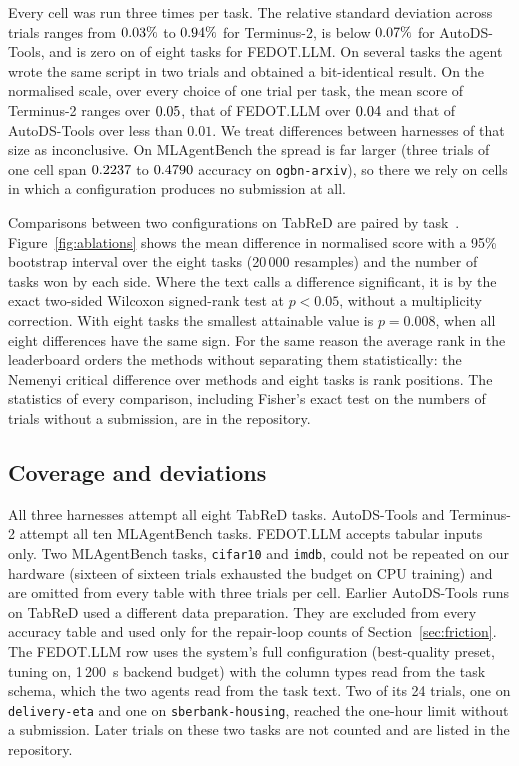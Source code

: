 Every cell was run three times per task. The relative standard deviation
across trials ranges from $0.03\%$ to $0.94\%$
for Terminus-2, is below $0.07\%$ for AutoDS-Tools, and is zero
on \allIdentFedot{} of eight tasks for FEDOT.LLM. On several tasks the agent
wrote the same script in two trials and obtained a bit-identical result.
On the normalised scale, over every choice of one trial per task, the mean
score of Terminus-2 ranges over $0.05$, that of FEDOT.LLM over
$0.04$ and that of AutoDS-Tools over less than $0.01$. We treat
differences between harnesses of that size as inconclusive. On MLAgentBench
the spread is far larger (three trials of one cell span $0.2237$
to $0.4790$ accuracy on \texttt{ogbn-arxiv}), so there we rely on
cells in which a configuration produces no submission at all.

Comparisons between two configurations on TabReD are paired by
task~\citep{demsar2006statistical}. Figure~\ref{fig:ablations} shows the mean
difference in normalised score with a 95\% bootstrap interval over the eight
tasks (20\,000 resamples) and the number of tasks won by each side. Where
the text calls a difference significant, it is by the exact two-sided
Wilcoxon signed-rank test at $p<0.05$, without a multiplicity correction.
With eight tasks the smallest attainable value is $p=0.008$, when all eight
differences have the same sign. For the same reason the average rank in the
leaderboard orders the methods without separating them statistically: the
Nemenyi critical difference over \nMethods{} methods and eight tasks is
\nemenyiCD{} rank positions. The statistics of every comparison, including
Fisher's exact test on the numbers of trials without a submission, are in
the repository.

\subsection{Coverage and deviations}
\label{sec:coverage}

All three harnesses attempt all eight TabReD tasks. AutoDS-Tools and
Terminus-2 attempt all ten MLAgentBench tasks. FEDOT.LLM accepts tabular
inputs only. Two MLAgentBench tasks, \texttt{cifar10} and \texttt{imdb},
could not be repeated on our hardware (sixteen of sixteen trials exhausted
the budget on CPU training) and are omitted from every table with three
trials per cell. Earlier AutoDS-Tools runs on TabReD used a different data
preparation. They are excluded from every accuracy table and used only for
the repair-loop counts of Section~\ref{sec:friction}. The FEDOT.LLM row uses
the system's full configuration (best-quality preset, tuning on, 1\,200~s
backend budget) with the column types read from the task schema, which the
two agents read from the task text. Two of its 24 trials, one on
\texttt{delivery-eta} and one on \texttt{sberbank-housing}, reached the
one-hour limit without a submission. Later trials on these two tasks are
not counted and are listed in the repository.

